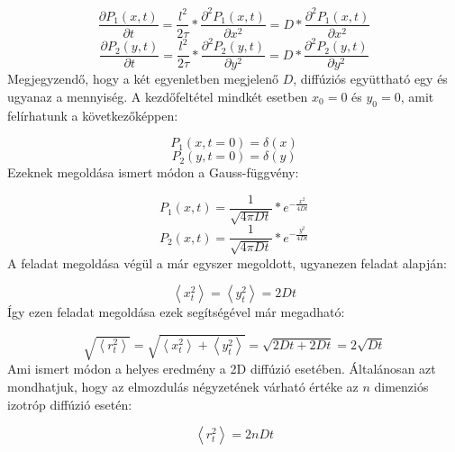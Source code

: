 \begin{equation}
    \frac{\partial P_{1} \left( x, t \right)}{\partial t} 
    =
    \frac{l^{2}}{2 \tau} * \frac{\partial^{2} P_{1} \left( x, t \right)}{\partial x^{2}}
    =
    D * \frac{\partial^{2} P_{1} \left( x, t \right)}{\partial x^{2}}
\end{equation}
\begin{equation}
    \frac{\partial P_{2} \left( y, t \right)}{\partial t} 
    =
    \frac{l^{2}}{2 \tau} * \frac{\partial^{2} P_{2} \left( y, t \right)}{\partial y^{2}}
    =
    D * \frac{\partial^{2} P_{2} \left( y, t \right)}{\partial y^{2}}
\end{equation}
Megjegyzendő, hogy a két egyenletben megjelenő $D$, diffúziós együttható egy és ugyanaz a mennyiség. A kezdőfeltétel mindkét esetben $x_{0} = 0$ és $y_{0} = 0$, amit felírhatunk a következőképpen:

\begin{equation*}
    P_{1} \left( x, t = 0 \right) = \delta \left( x \right)
\end{equation*}
\begin{equation*}
    P_{2} \left( y, t = 0 \right) = \delta \left( y \right)
\end{equation*}
Ezeknek megoldása ismert módon a Gauss-függvény:

\begin{equation}
    P_{1} \left( x, t \right) = \frac{1}{\sqrt{4 \pi D t}} * e^{-\tfrac{x^{2}}{4Dt}}
\end{equation}
\begin{equation}
    P_{2} \left( x, t \right) = \frac{1}{\sqrt{4 \pi D t}} * e^{-\tfrac{y^{2}}{4Dt}}
\end{equation}
A feladat megoldása végül a már egyszer megoldott, ugyanezen feladat alapján\cite{hazi1}:

\begin{equation}
    \left< x_{t}^{2} \right> = \left< y_{t}^{2} \right> = 2Dt
\end{equation}
Így ezen feladat megoldása ezek segítségével már megadható:

\begin{equation}
    \sqrt{\left< r_{t}^{2} \right>}
    =
    \sqrt{\left< x_{t}^{2} \right> + \left< y_{t}^{2} \right>}
    =
    \sqrt{2Dt + 2Dt}
    =
    \boxed{2 \sqrt{Dt}}
\end{equation}
Ami ismert módon a helyes eredmény a 2D diffúzió esetében. Általánosan azt mondhatjuk, hogy az elmozdulás négyzetének várható értéke az $n$ dimenziós izotróp diffúzió esetén\cite{diffusion}:

\begin{equation}
    \left< r_{t}^{2} \right> = 2nDt
\end{equation}